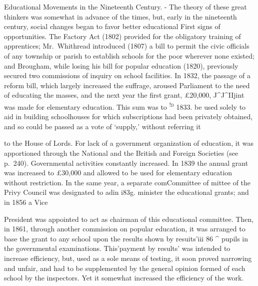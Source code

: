\documentclass[
]{book}
\begin{document}
Educational Movements in the Nineteenth Century. - The theory of these great thinkers was somewhat in advance of the times, but, early in the nineteenth century, social changes began to favor better educational First signs of opportunities. The Factory Act (1802) provided for the obligatory training of apprentices; Mr.~Whithread introduced (1807) a bill to permit the civic officials of any township or parish to establish schools for the poor wherever none existed; and Brougham, while losing his bill for popular education (1820), previously secured two commissions of inquiry on school facilities. In 1832, the passage of a reform bill, which largely increased the suffrage, aroused Parliament to the need of educating the masses, and the next year the first grant, £20,000, J\^{}J\^{}IIjint was made for elementary education. This sum was to \textsc{\textsuperscript{!d} }1833. be used solely to aid in building schoolhouses for which subscriptions had been privately obtained, and so could be passed as a vote of `supply,' without referring it

to the House of Lords. For lack of a government organization of education, it was apportioned through the National and the British and Foreign Societies (see p.~240). Governmental activities constantly increased. In 1839 the annual grant was increased to £30,000 and allowed to be used for elementary education without restriction. In the same year, a separate comCommittee of mittee of the Privy Council was designated to adin i83g. minister the educational grants; and in 1856 a Vice

President was appointed to act as chairman of this educational committee. Then, in 1861, through another commission on popular education, it was arranged to base the grant to any school upon the results shown by resuits'iii 86 \^{} pupils in the governmental examinations. This'payment by results' was intended to increase efficiency, but, used as a sole means of testing, it soon proved narrowing and unfair, and had to be supplemented by the general opinion formed of each school by the inspectors. Yet it somewhat increased the efficiency of the work.
\end{document}
